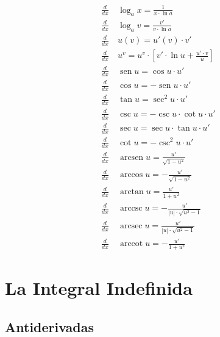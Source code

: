 \documentclass[11pt,letterpaper,oneside]{book}
\numberwithin{equation}{section}
\newcommand{\der}[1][x]{\frac{d}{d#1} }
\newcommand{\inv}[1]{\operatorname{arc#1}}
\begin{document}
	\begin{minipage}{0.48\textwidth}
		\begin{align}
			\der \ &\operatorname{log}_a x = \frac{1}{x \cdot \operatorname{ln}a} \\
			\der \ &\operatorname{log}_a v = \frac{v'}{v\cdot 	\operatorname{ln}a} \\
			\der \ &u(v) = u'(v) \cdot v'  \label{cadena}\\
			\der \ &u^v = u^v \cdot \left[v'\cdot \operatorname{ln}u + \frac{u' \cdot v}{u} \right] \\
			\der \ &\operatorname{sen}u = \operatorname{cos}u \cdot u' \\
			\der \ &\operatorname{cos}u = -\operatorname{sen}u \cdot u' \\
			\der \ &\operatorname{tan}u = \operatorname{sec}^2 u \cdot u' \\
			\der \ &\operatorname{csc}u = -\operatorname{csc}u \cdot \operatorname{cot}u \cdot u' \\
			\der \ &\operatorname{sec}u = \operatorname{sec}u 	\cdot \operatorname{tan}u \cdot u' \\
			\der \ &\operatorname{cot}u = -\operatorname{csc}^2 u \cdot u' \\
			\der \ &\inv{sen}u = \tfrac{u'}{\sqrt{1-u^2}} \\
			\der \ &\inv{cos}u = -\tfrac{u'}{\sqrt{1-u^2}} \\
			\der \ &\inv{tan}u = \tfrac{u'}{1+u^2} \\
			\der \ &\inv{csc}u = - \tfrac{u'}{|u|\cdot \sqrt{u^2-1}}\\
			\der \ &\inv{sec}u = \tfrac{u'}{|u|\cdot \sqrt{u^2-1}} \\
			\der \ &\inv{cot}u = -\tfrac{u'}{1+u^2}
		\end{align}
	\end{minipage}
	

	\chapter{La Integral Indefinida}
	\section{Antiderivadas}
\end{document}
